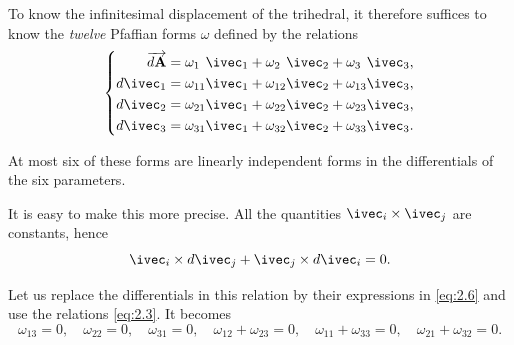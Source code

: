 To know the infinitesimal displacement of the trihedral, it therefore suffices to know the \emph{twelve} Pfaffian forms $\omega$ defined by the relations
\begin{equation}
  \label{eq:2.6}
  \left\{
    \begin{aligned}
      \overrightarrow{d\mathbf{A}}&=\omega_{1\hphantom{0}}\ivec_{1}+\omega_{2\hphantom{0}}\ivec_{2}+\omega_{3\hphantom{0}}\ivec_{3},\\
      d\ivec_{1}&=\omega_{11}\ivec_{1}+\omega_{12}\ivec_{2}+\omega_{13}\ivec_{3},\\
      d\ivec_{2}&=\omega_{21}\ivec_{1}+\omega_{22}\ivec_{2}+\omega_{23}\ivec_{3},\\
      d\ivec_{3}&=\omega_{31}\ivec_{1}+\omega_{32}\ivec_{2}+\omega_{33}\ivec_{3}.
    \end{aligned}
  \right.
\end{equation}

At most six of these forms are linearly independent forms in the differentials of the six parameters.

It is easy to make this more precise. All the quantities $\ivec_{i}\times\ivec_{j}$ are constants, hence
\[
\ivec_{i}\times d\ivec_{j}+\ivec_{j}\times d\ivec_{i}=0.
\]

Let us replace the differentials in this relation by their expressions in \eqref{eq:2.6} and use the relations \eqref{eq:2.3}. It becomes
\[
\omega_{13}=0,\quad\omega_{22}=0,\quad\omega_{31}=0,\quad\omega_{12}+\omega_{23}=0,\quad\omega_{11}+\omega_{33}=0,\quad\omega_{21}+\omega_{32}=0.
\]

